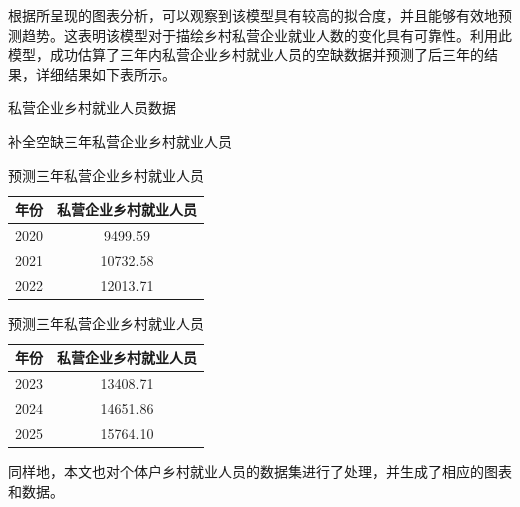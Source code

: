根据所呈现的图表分析，可以观察到该模型具有较高的拟合度，并且能够有效地预测趋势。这表明该模型对于描绘乡村私营企业就业人数的变化具有可靠性。利用此模型，成功估算了三年内私营企业乡村就业人员的空缺数据并预测了后三年的结果，详细结果如下表所示。


\begin{table}[H]
\caption{私营企业乡村就业人员数据}
\begin{subtable}{0.5\textwidth}
  \centering
  \caption{补全空缺三年私营企业乡村就业人员}
  \begin{tabular}{cc}
    \hline
    \hline
    \textbf{年份} & \textbf{私营企业乡村就业人员}\\
    \hline
    2020 & 9499.59\\
    2021 & 10732.58\\
    2022 & 12013.71\\
    \hline
  \end{tabular}
\end{subtable}%
\begin{subtable}{0.5\textwidth}
  \centering
  \caption{预测三年私营企业乡村就业人员}
  \begin{tabular}{cc}
    \hline
    \hline
    \textbf{年份} & \textbf{私营企业乡村就业人员}\\
    \hline
    2023 & 13408.71\\
    2024 & 14651.86\\
    2025 & 15764.10\\
    \hline
  \end{tabular}
\end{subtable}

\end{table}


同样地，本文也对个体户乡村就业人员的数据集进行了处理，并生成了相应的图表和数据。

